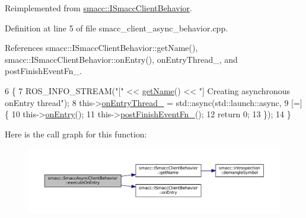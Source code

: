 Reimplemented from \hyperlink{classsmacc_1_1ISmaccClientBehavior_a90b7032f7520f9e7e805835e6ed9d43e}{smacc\+::\+I\+Smacc\+Client\+Behavior}.



Definition at line 5 of file smacc\+\_\+client\+\_\+async\+\_\+behavior.\+cpp.



References smacc\+::\+I\+Smacc\+Client\+Behavior\+::get\+Name(), smacc\+::\+I\+Smacc\+Client\+Behavior\+::on\+Entry(), on\+Entry\+Thread\+\_\+, and post\+Finish\+Event\+Fn\+\_\+.


\begin{DoxyCode}
6     \{
7         ROS\_INFO\_STREAM(\textcolor{stringliteral}{"["} << \hyperlink{classsmacc_1_1ISmaccClientBehavior_a18e4bec9460b010f2894c0f7e7064a34}{getName}() << \textcolor{stringliteral}{"] Creating asynchronous onEntry thread"});
8         this->\hyperlink{classsmacc_1_1SmaccAsyncClientBehavior_a6346e036a68f41c4397d7336f8519645}{onEntryThread\_} = std::async(std::launch::async,
9                                           [=] \{
10                                               this->\hyperlink{classsmacc_1_1ISmaccClientBehavior_a3ec24a839087c550e1d62a81e48cf530}{onEntry}();
11                                               this->\hyperlink{classsmacc_1_1SmaccAsyncClientBehavior_af7a9ee952ba3fb8629aa55491606a7b2}{postFinishEventFn\_}();
12                                               \textcolor{keywordflow}{return} 0;
13                                           \});
14     \}
\end{DoxyCode}
Here is the call graph for this function\+:
\nopagebreak
\begin{figure}[H]
\begin{center}
\leavevmode
\includegraphics[width=350pt]{classsmacc_1_1SmaccAsyncClientBehavior_ab8ca63d40d61554263466fe4c0b5cbd1_cgraph}
\end{center}
\end{figure}
\mbox{\label{classsmacc_1_1SmaccAsyncClientBehavior_a3d982d370df4f133ad37c0b2370e9b82}} 
